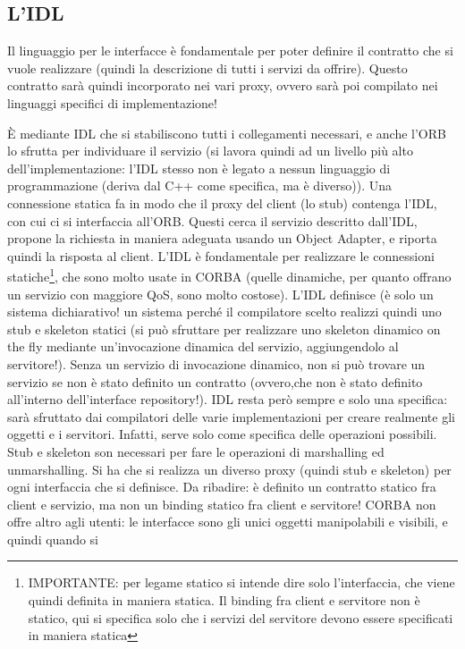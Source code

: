 \subsection{L'IDL}
Il linguaggio per le interfacce è fondamentale per poter definire il contratto che si vuole realizzare (quindi la
descrizione di tutti i servizi da offrire). Questo contratto sarà quindi incorporato nei vari proxy, ovvero sarà poi
compilato nei linguaggi specifici di implementazione!

È mediante IDL che si stabiliscono tutti i collegamenti necessari, e anche l'ORB lo sfrutta per individuare il servizio
(si lavora quindi ad un livello più alto dell'implementazione: l'IDL stesso non è legato a nessun linguaggio di
programmazione (deriva dal C++ come specifica, ma è diverso)). Una connessione statica fa in modo che il proxy del
client (lo stub) contenga l'IDL, con cui ci si interfaccia all'ORB. Questi cerca il servizio descritto dall'IDL, propone
la richiesta in maniera adeguata usando un Object Adapter, e riporta quindi la risposta al client.
L'IDL è fondamentale per realizzare le connessioni statiche\footnote{IMPORTANTE: per legame statico si intende dire solo
l'interfaccia, che viene quindi definita in maniera statica. Il binding fra client e servitore non è statico, qui si
specifica solo che i servizi del servitore devono essere specificati in maniera statica}, che sono molto usate in CORBA
(quelle dinamiche, per quanto offrano un servizio con maggiore QoS, sono molto costose). L'IDL definisce (è solo un
sistema dichiarativo! un sistema perché il compilatore scelto realizzi quindi uno stub e skeleton statici (si può
sfruttare per realizzare uno skeleton dinamico on the fly mediante un'invocazione dinamica del servizio, aggiungendolo
al servitore!). Senza un servizio di invocazione dinamico, non si può trovare un servizio se non è stato definito un
contratto (ovvero,che non è stato definito all'interno dell'interface repository!).
IDL resta però sempre e solo una specifica: sarà sfruttato dai compilatori delle varie implementazioni per creare
realmente gli oggetti e i servitori. Infatti, serve solo come specifica delle operazioni possibili.
Stub e skeleton son necessari per fare le operazioni di marshalling ed unmarshalling. Si ha che si realizza un diverso
proxy (quindi stub e skeleton) per ogni interfaccia che si definisce.
Da ribadire: è definito un contratto statico fra client e servizio, ma non un binding statico fra client e servitore!
CORBA non offre altro agli utenti: le interfacce sono gli unici oggetti manipolabili e visibili, e quindi quando si

